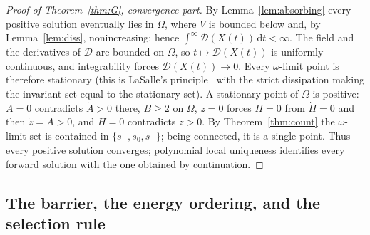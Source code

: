 \documentclass[11pt,a4paper]{article}
\theoremstyle{plain}
\theoremstyle{definition}
\theoremstyle{remark}
\newcommand{\D}{\mathcal{D}}
\newcommand{\dd}{\,\mathrm{d}}
\begin{document}
\begin{proof}[Proof of Theorem~\ref{thm:G}, convergence part]
By Lemma~\ref{lem:absorbing} every positive solution eventually lies in $\Omega$, where $V$ is bounded below and, by Lemma~\ref{lem:diss}, nonincreasing; hence $\int^\infty\D(X(t))\dd t<\infty$. The field and the derivatives of $\D$ are bounded on $\Omega$, so $t\mapsto\D(X(t))$ is uniformly continuous, and integrability forces $\D(X(t))\to0$. Every $\omega$-limit point is therefore stationary (this is LaSalle's principle~\cite{lasalle1960} with the strict dissipation making the invariant set equal to the stationary set). A stationary point of $\Omega$ is positive: $A=0$ contradicts $\dot A>0$ there, $B\ge2$ on $\Omega$, $z=0$ forces $H=0$ from $\dot H=0$ and then $\dot z=A>0$, and $H=0$ contradicts $z>0$. By Theorem~\ref{thm:count} the $\omega$-limit set is contained in $\{s_-,s_0,s_+\}$; being connected, it is a single point. Thus every positive solution converges; polynomial local uniqueness identifies every forward solution with the one obtained by continuation.
\end{proof}

\subsection{The barrier, the energy ordering, and the selection rule}
\end{document}
